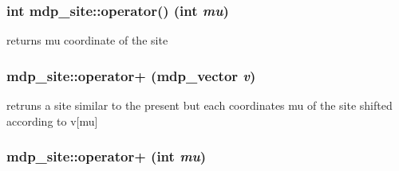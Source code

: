 \label{classmdp__site_af393fef955cb91629ece72746a582236}
\hypertarget{classmdp__site_abbbb7f94657ed5112919578d63a3272c}{
\subsubsection[{operator()}]{\setlength{\rightskip}{0pt plus 5cm}int mdp\_\-site::operator() (int {\em mu})}}
\label{classmdp__site_abbbb7f94657ed5112919578d63a3272c}


returns mu coordinate of the site \hypertarget{classmdp__site_a5fc9e1550603644416108c92cbf3cab8}{
\subsubsection[{operator+}]{ mdp\_\-site::operator+ ({\bf mdp\_\-vector} {\em v})}}
\label{classmdp__site_a5fc9e1550603644416108c92cbf3cab8}
retruns a site similar to the present but each coordinates mu of the site shifted according to v\mbox{[}mu\mbox{]} \hypertarget{classmdp__site_a86993407e982dc5dbc92cca7dfdaa536}{
\subsubsection[{operator+}]{ mdp\_\-site::operator+ (int {\em mu})}}
\label{classmdp__site_a86993407e982dc5dbc92cca7dfdaa536}


